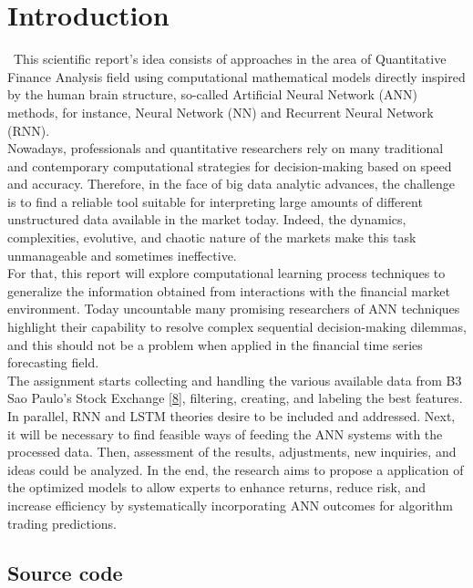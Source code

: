 \section{Introduction}
\label{chap:Introduction}

\quad \, This scientific report's idea consists of approaches in the area of Quantitative Finance Analysis field using computational mathematical models directly inspired by the human brain structure, so-called  Artificial Neural Network (ANN) methods, for instance, Neural Network (NN) and Recurrent Neural Network (RNN).\\

Nowadays, professionals and quantitative researchers rely on many traditional and contemporary computational strategies for decision-making based on speed and accuracy. Therefore, in the face of big data analytic advances, the challenge is to find a reliable tool suitable for interpreting large amounts of different unstructured data available in the market today. Indeed, the dynamics, complexities, evolutive, and chaotic nature of the markets make this task unmanageable and sometimes ineffective.\\

For that, this report will explore computational learning process techniques to generalize the information obtained from interactions with the financial market environment. Today uncountable many promising researchers of ANN techniques highlight their capability to resolve complex sequential decision-making dilemmas, and this should not be a problem when applied in the financial time series forecasting field.\\

The assignment starts collecting and handling the various available data from B3 Sao Paulo's Stock Exchange \hyperref[Bib:b3 quotes]{[8]}, filtering, creating, and labeling the best features.  In parallel, RNN and LSTM theories desire to be included and addressed. Next, it will be necessary to find feasible ways of feeding the ANN systems with the processed data. Then, assessment of the results, adjustments, new inquiries, and ideas could be analyzed. In the end, the research aims to propose a application of the optimized models to allow experts to enhance returns, reduce risk, and increase efficiency by systematically incorporating ANN outcomes for algorithm trading predictions.

\subsection{Source code}
\label{chap:Source code}


